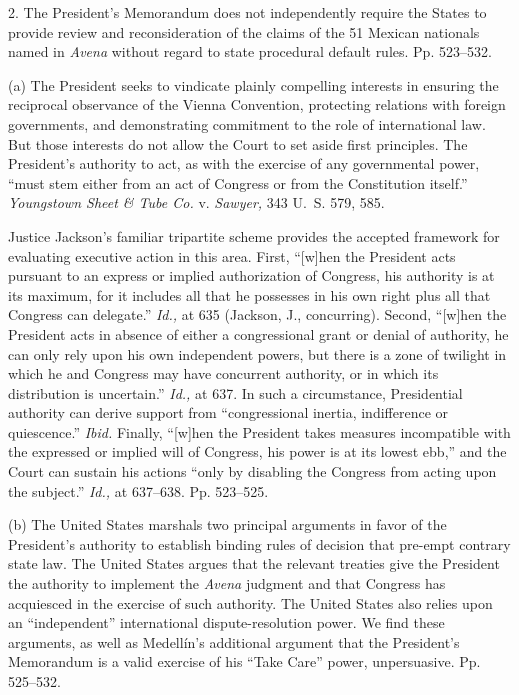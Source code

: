  2. The President's Memorandum does not independently require the
States to provide review and reconsideration of the claims of the 51
\newpage  Mexican nationals named in \emph{Avena} without regard to state
procedural default rules. Pp. 523--532.

  (a) The President seeks to vindicate plainly compelling interests in
ensuring the reciprocal observance of the Vienna Convention, protecting
relations with foreign governments, and demonstrating commitment to the
role of international law. But those interests do not allow the Court to
set aside first principles. The President's authority to act, as with
the exercise of any governmental power, ``must stem either from an act
of Congress or from the Constitution itself.'' \emph{Youngstown Sheet \&
Tube Co.} v. \emph{Sawyer,} 343 U.~S. 579, 585.

  Justice Jackson's familiar tripartite scheme provides the accepted
framework for evaluating executive action in this area. First, ``[w]hen
the President acts pursuant to an express or implied authorization of
Congress, his authority is at its maximum, for it includes all that
he possesses in his own right plus all that Congress can delegate.''
\emph{Id.,} at 635 (Jackson, J., concurring). Second, ``[w]hen the
President acts in absence of either a congressional grant or denial of
authority, he can only rely upon his own independent powers, but there
is a zone of twilight in which he and Congress may have concurrent
authority, or in which its distribution is uncertain.'' \emph{Id.,} at
637. In such a circumstance, Presidential authority can derive support
from ``congressional inertia, indifference or quiescence.'' \emph{Ibid.}
Finally, ``[w]hen the President takes measures incompatible with the
expressed or implied will of Congress, his power is at its lowest
ebb,'' and the Court can sustain his actions ``only by disabling the
Congress from acting upon the subject.'' \emph{Id.,} at 637--638.
Pp. 523--525.

  (b) The United States marshals two principal arguments in favor of
the President's authority to establish binding rules of decision
that pre-empt contrary state law. The United States argues that the
relevant treaties give the President the authority to implement the
\emph{Avena} judgment and that Congress has acquiesced in the exercise of
such authority. The United States also relies upon an ``independent''
international dispute-resolution power. We find these arguments, as well
as Medellín's additional argument that the President's Memorandum
is a valid exercise of his ``Take Care'' power, unpersuasive. Pp.
525--532.

